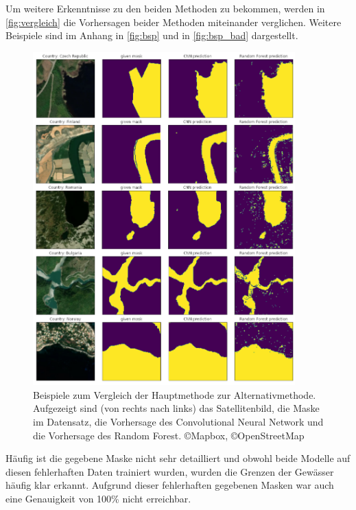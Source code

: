Um weitere Erkenntnisse zu den beiden Methoden zu bekommen, werden in \autoref{fig:vergleich} die Vorhersagen beider Methoden miteinander verglichen.
Weitere Beispiele sind im Anhang in \autoref{fig:bsp} und in \autoref{fig:bsp_bad} dargestellt.

\begin{figure}
    \centering
    \includegraphics[width=0.9\textwidth]{images/vergleich.png}
    \caption{Beispiele zum Vergleich der Hauptmethode zur Alternativmethode. %
    Aufgezeigt sind (von rechts nach links) das Satellitenbild, die Maske im Datensatz, die Vorhersage des Convolutional Neural Network und die Vorhersage des Random Forest.%
    \copyright Mapbox, \copyright OpenStreetMap}
    \label{fig:vergleich}
\end{figure}

Häufig ist die gegebene Maske nicht sehr detailliert 
und obwohl beide Modelle auf diesen fehlerhaften Daten trainiert wurden,
wurden die Grenzen der Gewässer häufig klar erkannt.
Aufgrund dieser fehlerhaften gegebenen Masken war auch eine Genauigkeit von 100\% nicht erreichbar.

